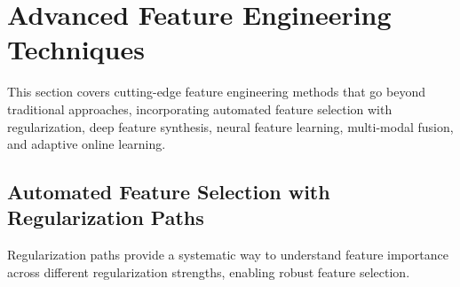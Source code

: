 \section{Advanced Feature Engineering Techniques}

This section covers cutting-edge feature engineering methods that go beyond traditional approaches, incorporating automated feature selection with regularization, deep feature synthesis, neural feature learning, multi-modal fusion, and adaptive online learning.

\subsection{Automated Feature Selection with Regularization Paths}

Regularization paths provide a systematic way to understand feature importance across different regularization strengths, enabling robust feature selection.

